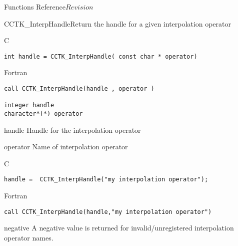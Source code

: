 \begin{cactuspart}{ Functions Reference}{}{$Revision$}

\begin{FunctionDescription}{CCTK\_InterpHandle}{Return the handle for a given interpolation operator}
\label{CCTK-InterpHandle}
\begin{SynopsisSection}
\begin{Synopsis}{C}
\begin{verbatim}int handle = CCTK_InterpHandle( const char * operator)\end{verbatim}
\end{Synopsis}
\begin{Synopsis}{Fortran}
\begin{verbatim}call CCTK_InterpHandle(handle , operator )

integer handle
character*(*) operator\end{verbatim}
\end{Synopsis}
\end{SynopsisSection}
\begin{ParameterSection}
\begin{Parameter}{handle}
Handle for the interpolation operator
\end{Parameter}
\begin{Parameter}{operator}
Name of interpolation operator
\end{Parameter}
\end{ParameterSection}

\begin{ExampleSection}
\begin{Example}{C}
\begin{verbatim}
handle =  CCTK_InterpHandle("my interpolation operator");
\end{verbatim}
\end{Example}
\begin{Example}{Fortran}
\begin{verbatim}
call CCTK_InterpHandle(handle,"my interpolation operator")
\end{verbatim}
\end{Example}
\end{ExampleSection}
\begin{ErrorSection}
\begin{Error}{negative}
A negative value is returned for invalid/unregistered interpolation operator names.
\end{Error}
\end{ErrorSection}
\end{FunctionDescription}


\end{cactuspart}
